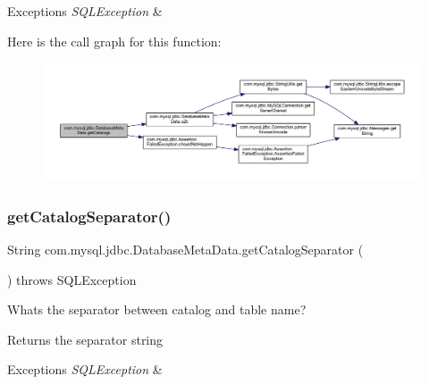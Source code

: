 \begin{DoxyExceptions}{Exceptions}
{\em S\+Q\+L\+Exception} & \\
\hline
\end{DoxyExceptions}
Here is the call graph for this function\+:\nopagebreak
\begin{figure}[H]
\begin{center}
\leavevmode
\includegraphics[width=350pt]{classcom_1_1mysql_1_1jdbc_1_1_database_meta_data_aead6a147747c6041b3dc03399b30bd9c_cgraph}
\end{center}
\end{figure}
\mbox{\label{classcom_1_1mysql_1_1jdbc_1_1_database_meta_data_adf1e3db4691e9d18ece7d86f594b8125}} 
\subsubsection{\texorpdfstring{get\+Catalog\+Separator()}{getCatalogSeparator()}}
{\footnotesize\ttfamily String com.\+mysql.\+jdbc.\+Database\+Meta\+Data.\+get\+Catalog\+Separator (\begin{DoxyParamCaption}{ }\end{DoxyParamCaption}) throws S\+Q\+L\+Exception}

What\textquotesingle{}s the separator between catalog and table name?

\begin{DoxyReturn}{Returns}
the separator string 
\end{DoxyReturn}

\begin{DoxyExceptions}{Exceptions}
{\em S\+Q\+L\+Exception} & \\
\hline
\end{DoxyExceptions}
\mbox{\label{classcom_1_1mysql_1_1jdbc_1_1_database_meta_data_a333983afb7152e0b032df87f472bd908}} 
